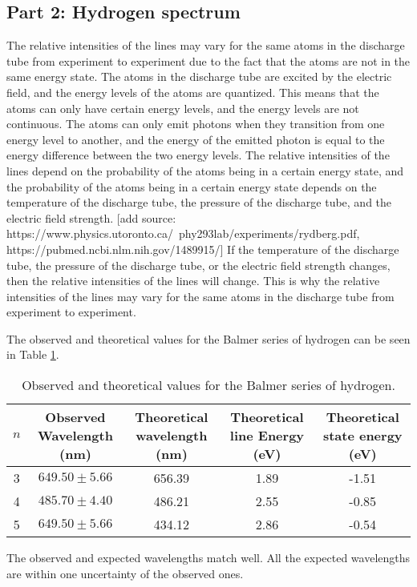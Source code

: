 
\subsection{Part 2: Hydrogen spectrum}



The relative intensities of the lines may vary for the same atoms in the discharge tube from experiment to experiment due to the fact that the atoms are not in the same energy state.
The atoms in the discharge tube are excited by the electric field, and the energy levels of the atoms are quantized.
This means that the atoms can only have certain energy levels, and the energy levels are not continuous.
The atoms can only emit photons when they transition from one energy level to another, and the energy of the emitted photon is equal to the energy difference between the two energy levels.
The relative intensities of the lines depend on the probability of the atoms being in a certain energy state, and the probability of the atoms being in a certain energy state depends on the temperature of the discharge tube,
the pressure of the discharge tube, and the electric field strength. [add source: https://www.physics.utoronto.ca/~phy293lab/experiments/rydberg.pdf, https://pubmed.ncbi.nlm.nih.gov/1489915/] If the temperature of the discharge tube, the pressure of the discharge tube, or the electric field strength changes, then the relative intensities of the lines will change.
This is why the relative intensities of the lines may vary for the same atoms in the discharge tube from experiment to experiment.

The observed and theoretical values for the Balmer series of hydrogen can be seen in Table \ref{tab:my_label}.

\begin{table}[h]
    \centering
    \begin{adjustbox}{width=1.5\textwidth, center}
        \begin{tabular}{|c|c|c|c|c|}
            \hline
            $n$ & Observed Wavelength (nm) & Theoretical wavelength (nm) & Theoretical line Energy (eV) & Theoretical state energy (eV) \\
            \hline
            3   & $649.50 \pm 5.66$        & 656.39                      & 1.89                         & -1.51                         \\
            4   & $485.70 \pm 4.40$        & 486.21                      & 2.55                         & -0.85                         \\
            5   & $649.50 \pm 5.66$        & 434.12                      & 2.86                         & -0.54                         \\
            \hline
        \end{tabular}
    \end{adjustbox}
    \caption{Observed and theoretical values for the Balmer series of hydrogen.}
    \label{tab:my_label}
\end{table}


The observed and expected wavelengths match well. All the expected wavelengths are within one uncertainty of the observed ones.